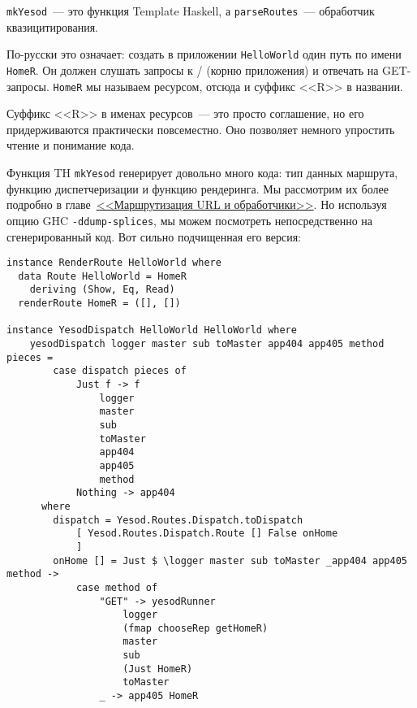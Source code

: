 \begin{remark}
  \lstinline!mkYesod!~--- это функция Template Haskell, а \lstinline!parseRoutes!~---
  обработчик квазицитирования.
\end{remark}

По-русски это означает: создать в приложении \texttt{HelloWorld} один путь по имени
\lstinline!HomeR!. Он должен слушать запросы к / (корню приложения) и отвечать на
GET-запросы. \lstinline!HomeR! мы называем ресурсом, отсюда и суффикс <<R>> в названии.

\begin{remark}
  Суффикс <<R>> в именах ресурсов~--- это просто соглашение, но его придерживаются
  практически повсеместно. Оно позволяет немного упростить чтение и понимание кода.
\end{remark}

Функция TH \lstinline!mkYesod! генерирует довольно много кода: тип данных маршрута,
функцию диспетчеризации и функцию рендеринга. Мы рассмотрим их более подробно в
главе~\hyperref[chap:routing]{<<Маршрутизация URL и обработчики>>}. Но используя опцию GHC
\lstinline'-ddump-splices', мы можем посмотреть непосредственно на сгенерированный
код. Вот сильно подчищенная его версия:

\begin{lstlisting}
instance RenderRoute HelloWorld where
  data Route HelloWorld = HomeR
    deriving (Show, Eq, Read)
  renderRoute HomeR = ([], [])

instance YesodDispatch HelloWorld HelloWorld where
    yesodDispatch logger master sub toMaster app404 app405 method pieces =
        case dispatch pieces of
            Just f -> f
                logger
                master
                sub
                toMaster
                app404
                app405
                method
            Nothing -> app404
      where
        dispatch = Yesod.Routes.Dispatch.toDispatch
            [ Yesod.Routes.Dispatch.Route [] False onHome
            ]
        onHome [] = Just $ \logger master sub toMaster _app404 app405 method ->
            case method of
                "GET" -> yesodRunner
                    logger
                    (fmap chooseRep getHomeR)
                    master
                    sub
                    (Just HomeR)
                    toMaster
                _ -> app405 HomeR
\end{lstlisting}

